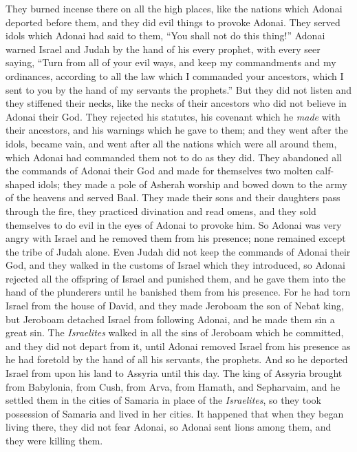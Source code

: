 \begin{biblechapter}
\verse They burned incense there on all the high places, like the nations which Adonai deported before them, and they did evil things to provoke Adonai.
\verse They served idols which Adonai had said to them, “You shall not do this thing!”
\verse Adonai warned Israel and Judah by the hand of his every prophet, with every seer saying, “Turn from all of your evil ways, and keep my commandments and my ordinances, according to all the law which I commanded your ancestors, which I sent to you by the hand of my servants the prophets.”
\verse But they did not listen and they stiffened their necks, like the necks of their ancestors who did not believe in Adonai their God.
\verse They rejected his statutes, his covenant which he \textit{made} with their ancestors, and his warnings which he gave to them; and they went after the idols, became vain, and went after all the nations which were all around them, which Adonai had commanded them not to do as they did.
\verse They abandoned all the commands of Adonai their God and made for themselves two molten calf-shaped idols; they made a pole of Asherah worship and bowed down to the army of the heavens and served Baal.
\verse They made their sons and their daughters pass through the fire, they practiced divination and read omens, and they sold themselves to do evil in the eyes of Adonai to provoke him.
\verse So Adonai was very angry with Israel and he removed them from his presence; none remained except the tribe of Judah alone.
\verse Even Judah did not keep the commands of Adonai their God, and they walked in the customs of Israel which they introduced,
\verse so Adonai rejected all the offspring of Israel and punished them, and he gave them into the hand of the plunderers until he banished them from his presence.
\verse For he had torn Israel from the house of David, and they made Jeroboam the son of Nebat king, but Jeroboam detached Israel from following Adonai, and he made them sin a great sin.
\verse The \textit{Israelites} walked in all the sins of Jeroboam which he committed, and they did not depart from it,
\verse until Adonai removed Israel from his presence as he had foretold by the hand of all his servants, the prophets. And so he deported Israel from upon his land to Assyria until this day.
 The king of Assyria brought from Babylonia, from Cush, from Arva, from Hamath, and Sepharvaim, and he settled them in the cities of Samaria in place of the \textit{Israelites}, so they took possession of Samaria and lived in her cities.
\verse It happened that when they began living there, they did not fear Adonai, so Adonai sent lions among them, and they were killing them.

\end{biblechapter}
